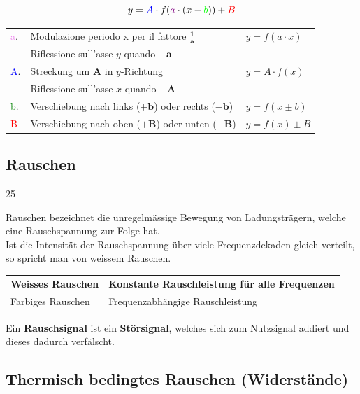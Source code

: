$$y= \textcolor{blue}{A} \cdot f(\textcolor{violet}{a} \cdot (x-\textcolor{green}{b})) + \textcolor{red}{B}$$
\begin{tabular}{lll}
    \textcolor{violet}{a}.  & Modulazione periodo x per il fattore $\bm{\frac{1}{a}}$               & $y = f(a \cdot x)$    \\
        & Riflessione sull'asse-$y$ quando $\bm{-a}$ \\
    \textcolor{blue}{A}.  & Streckung um $\bm{A}$ in $y$-Richtung                         & $y = A \cdot f(x)$    \\
        & Riflessione sull'asse-$x$ quando $\bm{-A}$ \\
    \textcolor{green}{b}.  & Verschiebung nach links ($\bm{+b}$) oder rechts ($\bm{-b}$)   & $y = f(x \pm b)$      \\
    \textcolor{red}{B}  & Verschiebung nach oben ($\bm{+B}$) oder unten ($\bm{-B}$)     & $y = f(x) \pm B $ 
\end{tabular}\vspace{0.5em}


\subsection{Rauschen}{25}

Rauschen bezeichnet die unregelmässige Bewegung von Ladungsträgern, welche eine Rauschspannung zur Folge hat. \\
Ist die Intensität der Rauschspannung über viele Frequenzdekaden gleich verteilt, so spricht man von weissem Rauschen.

\vspace{0.2cm}

\begin{tabular}{ll}
    \textbf{Weisses Rauschen}   & \textbf{Konstante Rauschleistung für alle Frequenzen} \\
    Farbiges Rauschen           & Frequenzabhängige Rauschleistung 
\end{tabular}

\vspace{0.2cm}

Ein \textbf{Rauschsignal} ist ein \textbf{Störsignal}, welches sich zum Nutzsignal addiert und dieses dadurch verfälscht.


\subsection{Thermisch bedingtes Rauschen (Widerstände)}

